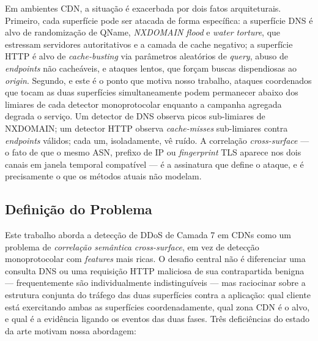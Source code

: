 \documentclass[preprint,12pt]{elsarticle}
\begin{document}
Em ambientes CDN, a situação é exacerbada por dois fatos arquiteturais. Primeiro, cada superfície pode ser atacada de forma específica: a superfície DNS é alvo de randomização de QName, \emph{NXDOMAIN flood} e \emph{water torture}, que estressam servidores autoritativos e a camada de cache negativo; a superfície HTTP é alvo de \emph{cache-busting} via parâmetros aleatórios de \emph{query}, abuso de \emph{endpoints} não cacheáveis, e ataques lentos, que forçam buscas dispendiosas ao \emph{origin}. Segundo, e este é o ponto que motiva nosso trabalho, ataques coordenados que tocam as duas superfícies simultaneamente podem permanecer abaixo dos limiares de cada detector monoprotocolar enquanto a campanha agregada degrada o serviço. Um detector de DNS observa picos sub-limiares de NXDOMAIN; um detector HTTP observa \emph{cache-misses} sub-limiares contra \emph{endpoints} válidos; cada um, isoladamente, vê ruído. A correlação \emph{cross-surface} --- o fato de que o mesmo ASN, prefixo de IP ou \emph{fingerprint} TLS aparece nos dois canais em janela temporal compatível --- é a assinatura que define o ataque, e é precisamente o que os métodos atuais não modelam.

\subsection{Definição do Problema}

Este trabalho aborda a detecção de DDoS de Camada 7 em CDNs como um problema de \emph{correlação semântica cross-surface}, em vez de detecção monoprotocolar com \emph{features} mais ricas. O desafio central não é diferenciar uma consulta DNS ou uma requisição HTTP maliciosa de sua contrapartida benigna --- frequentemente são individualmente indistinguíveis --- mas raciocinar sobre a estrutura conjunta do tráfego das duas superfícies contra a aplicação: qual cliente está exercitando ambas as superfícies coordenadamente, qual zona CDN é o alvo, e qual é a evidência ligando os eventos das duas fases. Três deficiências do estado da arte motivam nossa abordagem:
\end{document}
